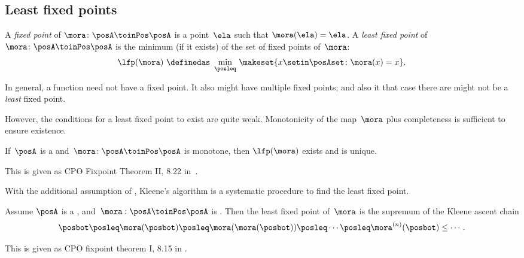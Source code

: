 \subsection{Least fixed points}

\begin{definition}
    \label{def:least-fixed}
    A \emph{fixed point} of $\mora\colon\posA\toinPos\posA$ is a point~$\ela$ such that $\mora(\ela)=\ela$.
    A \emph{least fixed point} of~$\mora\colon\posA\toinPos\posA$ is the minimum (if it exists) of the set of fixed points of~$\mora$:
    \begin{equation}
        \label{eq:lfp-one}
        \lfp(\mora)\,\,\definedas\,\,\min_{\posleq}\,\makeset{x\setin\posAset \colon \mora(x)=x}.
    \end{equation}
\end{definition}

In general, a function need not have a fixed point.
It also might have multiple fixed points; and also it that case there are might not be a \emph{least} fixed point.

However, the conditions for a least fixed point to exist are quite weak.
%
Monotonicity of the map~$\mora$ plus completeness is sufficient to ensure existence.

\begin{lemma}
    \label{lem:CPO-fix-point-2}
    If~$\posA$ is a \CPO and~$\mora\colon\posA\toinPos\posA$ is monotone, then $\lfp(\mora)$ exists and is unique.
\end{lemma}
This is given as CPO Fixpoint Theorem II, 8.22 in~\cite{davey02}.

With the additional assumption of \scottcontinuity, Kleene's algorithm is a systematic procedure to find the least fixed point.

\begin{lemma}
    \label{lem:kleene-1}
    Assume $\posA$ is a \CPO, and~$\mora:\linebreak[0]\posA\toinPos\posA$ is \scottcontinuous.
    Then the least fixed point of~$\mora$ is the supremum of the Kleene ascent chain
    \begin{equation}
        \label{eq:kleene-iteration}
        \posbot\posleq \mora(\posbot)\posleq \mora(\mora(\posbot))\posleq\cdots\posleq \mora^{(n)}(\posbot)\leq\cdots.
    \end{equation}
\end{lemma}
This is given as CPO fixpoint theorem I, 8.15 in \cite{davey02}.

